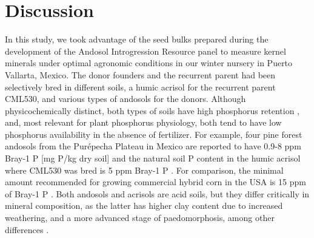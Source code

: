 \section{Discussion}
In this study, we took advantage of the seed bulks prepared during the development of the Andosol Introgression Resource panel to measure kernel minerals under optimal agronomic conditions in our winter nursery in Puerto Vallarta, Mexico.
The donor founders and the recurrent parent had been selectively bred in different soils, a humic acrisol for the recurrent parent CML530, and various types of andosols for the donors.
Although physicochemically distinct, both types of soils have high phosphorus retention \citep{batjes2011,bayuelo-jimenez2011}, and, most relevant for plant phosphorus physiology, both tend to have low phosphorus availability in the absence of fertilizer.
For example, four pine forest andosols from the Purépecha Plateau in Mexico are reported to have 0.9-8 ppm Bray-1 P [mg P/kg dry soil] \citep{galvan-tejada2014} and the natural soil P content in the humic acrisol where CML530 was bred is 5 ppm Bray-1 P \citep{granados1995}. 
For comparison, the minimal amount recommended for growing commercial hybrid corn in the USA is 15 ppm of Bray-1 P \citep{lyons2023}.
Both andosols and acrisols are acid soils, but they differ critically in mineral composition, as the latter has higher clay content due to increased weathering, and a more advanced stage of paedomorphosis, among other differences \citep{hexianjin2022,batjes2011, wrb2022}.


